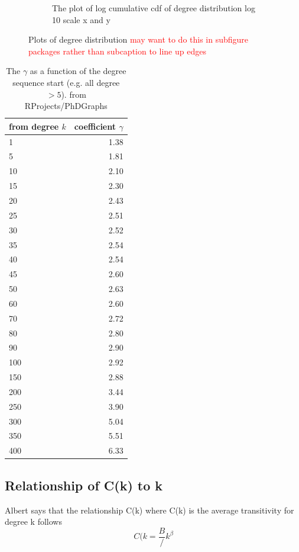 \begin{figure}
\begin{subfigure}[t]{0.45\textwidth}
        \caption{The plot of log cumulative cdf of degree distribution log 10 scale x and y} \label{fig:log_degree_distribution}
    \end{subfigure}
    \caption{Plots of degree distribution \textcolor{red}{may want to do this in subfigure packages rather than subcaption to line up edges}}
\end{figure}

\begin{table}[ht]
\centering
\begin{tabular}{lr}
  \hline
  from degree $k$ & coefficient $\gamma$ \\ 
  \hline
1 & 1.38 \\ 
  5 & 1.81 \\ 
  10 & 2.10 \\ 
  15 & 2.30 \\ 
  20 & 2.43 \\ 
  25 & 2.51 \\ 
   30 & 2.52 \\ 
  35 & 2.54 \\ 
   40 & 2.54 \\ 
   45 & 2.60 \\ 
  50 & 2.63 \\ 
   60 & 2.60 \\ 
   70 & 2.72 \\ 
   80 & 2.80 \\ 
   90 & 2.90 \\ 
   100 & 2.92 \\ 
  150 & 2.88 \\ 
   200 & 3.44 \\ 
   250 & 3.90 \\ 
  300 & 5.04 \\ 
   350 & 5.51 \\ 
   400 & 6.33 \\ 
   \hline
\end{tabular}
\caption{The $\gamma$ as a function of the degree sequence start (e.g. all degree $>5$). from RProjects/PhDGraphs}
  \label{table:gamma}
\end{table}

\subsection{Relationship of C(k) to k}

Albert \cite{albert2005scale} says that the relationship C(k) where C(k) is the average transitivity for degree k follows
\begin{equation}
    C(k = \frac{B}/k^{\beta}
\end{equation}

